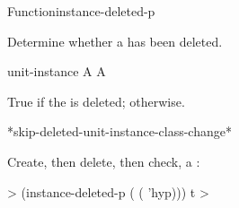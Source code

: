 \documentclass[10pt,twoside,english,pdftex]{article}
\begin{document}
\begin{functiondoc}{Function}{instance-deleted-p}{
    }

\fnsyntax

\fnpurpose Determine whether a  has been deleted. 

\fnpackage {}

\fnmodule {}

\fnargs
\begin{args}{unit-instance}
 A 
\arg[boolean] A 
\end{args}

\fnreturns True if the  is deleted; \nil{} otherwise.

\begin{alsos}{*skip-deleted-unit-instance-class-change*}
\end{alsos}

\fnexample
{}%
%
Create, then delete, then check, a  :
%
\W\supp
\begin{example}
  > (instance-deleted-p ( ( 'hyp)))
  t
  >
\end{example}

\end{functiondoc}

\end{document}

